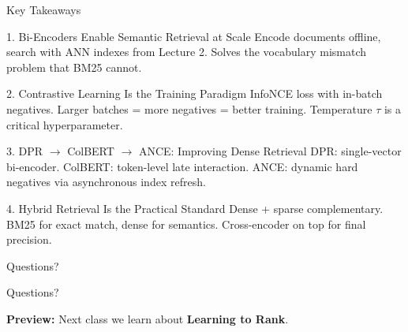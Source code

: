 \documentclass[aspectratio=169]{beamer}
\begin{document}
\begin{frame}[shrink=15]{Key Takeaways}
\begin{block}{1. Bi-Encoders Enable Semantic Retrieval at Scale}
Encode documents offline, search with ANN indexes from Lecture 2. Solves the vocabulary mismatch problem that BM25 cannot.
\end{block}

\begin{block}{2. Contrastive Learning Is the Training Paradigm}
InfoNCE loss with in-batch negatives. Larger batches = more negatives = better training. Temperature $\tau$ is a critical hyperparameter.
\end{block}

\begin{block}{3. DPR $\to$ ColBERT $\to$ ANCE: Improving Dense Retrieval}
DPR: single-vector bi-encoder. ColBERT: token-level late interaction. ANCE: dynamic hard negatives via asynchronous index refresh.
\end{block}

\begin{block}{4. Hybrid Retrieval Is the Practical Standard}
Dense + sparse complementary. BM25 for exact match, dense for semantics. Cross-encoder on top for final precision.
\end{block}
\end{frame}


\begin{frame}{Questions?}
\begin{center}
\Huge Questions?

\normalsize
\vspace{1em}
\textbf{Preview:} Next class we learn about \textbf{Learning to Rank}.
\end{center}
\end{frame}























\appendix
\end{document}
